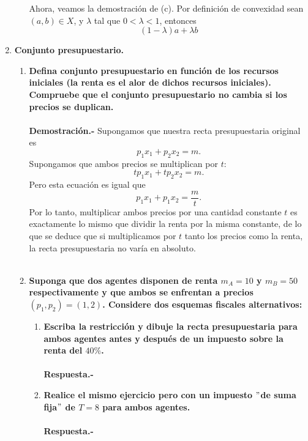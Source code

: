 \begin{enumerate}[\bfseries I.]
\begin{enumerate}[\bfseries 1.]
		Ahora, veamos la demostración de (c). Por definición de convexidad sean $(a,b)\in X$, y $\lambda$ tal que $0<\lambda<1$, entonces
		$$(1-\lambda)a+\lambda b$$

	\end{enumerate}

    \item \textbf{Conjunto presupuestario.}\;\\

	\begin{enumerate}[\bfseries 1.]

	    \item \textbf{Defina conjunto presupuestario en función de los recursos iniciales (la renta es el alor de dichos recursos iniciales). Compruebe que el conjunto presupuestario no cambia si los precios se duplican.\\\\
		Demostración.-}\; Supongamos que nuestra recta presupuestaria original es
		$$p_1x_1+p_2x_2=m.$$
		Supongamos que ambos precios se multiplican por $t$:
		$$tp_1 x_1+tp_2 x_2=m.$$
		Pero esta ecuación es igual que
		$$p_1x_1+p_1x_2=\dfrac{m}{t}.$$
		Por lo tanto, multiplicar ambos precios por una cantidad constante $t$ es exactamente lo mismo que dividir la renta por la misma constante, de lo que se deduce que si multiplicamos por $t$ tanto los precios como la renta, la recta presupuestaria no varía en absoluto.\\\\

	    \item \textbf{\boldmath Suponga que dos agentes disponen de renta $m_A=10$ y $m_B=50$ respectivamente y que ambos se enfrentan a precios $(p_1,p_2)=(1,2)$. Considere dos esquemas fiscales alternativos:} 
		
		\begin{enumerate}[\bfseries a)]

		    \item \textbf{\boldmath Escriba la restricción y dibuje la recta presupuestaria para ambos agentes antes y después de un impuesto sobre la renta del $40\%$.\\\\
			Respuesta.-}\;

		    \item \textbf{\boldmath Realice el mismo ejercicio pero con un impuesto $"$de suma fija$"$ de $T=8$ para ambos agentes.\\\\
			Respuesta.-}\;


\end{enumerate}
\end{enumerate}
\end{enumerate}
